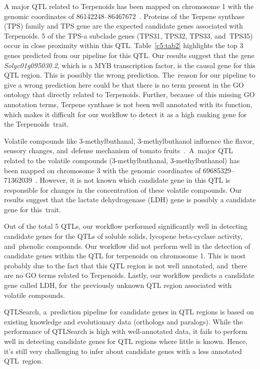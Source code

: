 \documentclass[applsci,article,accept,moreauthors,pdftex]{Definitions/mdpi}
\begin{document}
{A major QTL related to Terpenoids has been mapped on chromosome 1 with the genomic coordinates of 86142248--86467672~\cite{zhang2015genome}. Proteins of the Terpene synthase (TPS) family and TPS gene are the expected candidate genes associated with Terpenoids. 5 of the TPS-a subclade genes (TPS31, TPS32, TPS33, and~TPS35) occur in close proximity within this QTL. Table~\ref{c5:tab2} highlights the top 3 genes predicted from our pipeline for this QTL. Our results suggest that the gene \textit{Solyc01g095030.2}, which is a MYB transcription factor, is the causal gene for this QTL region. This is possibly the wrong prediction. The~reason for our pipeline to give a wrong prediction here could be that there is no term present in the GO ontology that directly related to Terpenoids. Further, because~of this missing GO annotation terms, Terpene synthase is not been well annotated with its function, which makes it difficult for our workflow to detect it as a high ranking gene for the Terpenoids~trait. 

Volatile compounds like 3-methylbuthanal, 3-methylbuthanol influence the flavor, sensory changes, and~defense mechanism of tomato fruits~\cite{socaci2014chemometric}.~A~major QTL related to the volatile compounds (3-methylbuthanal, 3-methylbuthanol) has been mapped on chromosome 3 with the genomic coordinates of 69685329--71362039~\cite{rambla2016identification}. However, it is not known which candidate gene in this QTL is responsible for changes in the concentration of these volatile compounds. Our results suggest that the lactate dehydrogenase (LDH) gene is possibly a candidate gene for this~trait. 


{Out of the total 5 QTLs, our workflow performed significantly well in detecting candidate genes for the QTLs of soluble solids, lycopene beta-cyclase activity, and~phenolic compounds. Our workflow did not perform well in the detection of candidate genes within the QTL for terpenoids on chromosome 1. This is most probably due to the fact that this QTL region is not well annotated, and~there are no GO terms related to Terpenoids. Lastly, our workflow predicts a candidate gene called LDH, for~the previously unknown QTL region associated with volatile compounds.} 


QTLSearch, a~prediction pipeline for candidate genes in QTL regions is based on existing knowledge and evolutionary data (orthologs and paralogs). While the performance of QTLSearch is high with well-annotated data, it fails to perform well in detecting candidate genes for QTL regions where little is known. Hence, it’s still very challenging to infer about candidate genes with a less annotated QTL~region.


}
\end{document}
